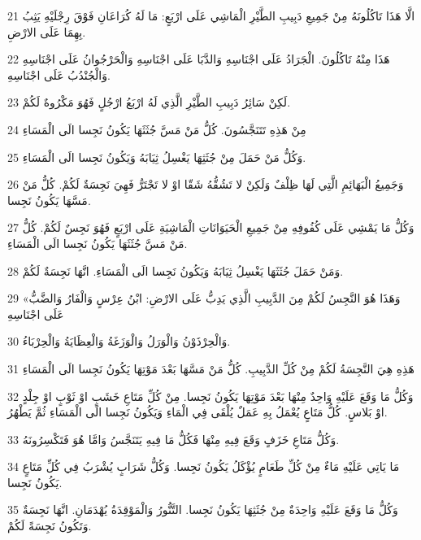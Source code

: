 \par 21 الَّا هَذَا تَاكُلُونَهُ مِنْ جَمِيعِ دَبِيبِ الطَّيْرِ الْمَاشِي عَلَى ارْبَعٍ: مَا لَهُ كُرَاعَانِ فَوْقَ رِجْلَيْهِ يَثِبُ بِهِمَا عَلَى الارْضِ.
\par 22 هَذَا مِنْهُ تَاكُلُونَ. الْجَرَادُ عَلَى اجْنَاسِهِ وَالدَّبَا عَلَى اجْنَاسِهِ وَالْحَرْجُوانُ عَلَى اجْنَاسِهِ وَالْجُنْدُبُ عَلَى اجْنَاسِهِ.
\par 23 لَكِنْ سَائِرُ دَبِيبِ الطَّيْرِ الَّذِي لَهُ ارْبَعُ ارْجُلٍ فَهُوَ مَكْرُوهٌ لَكُمْ.
\par 24 مِنْ هَذِهِ تَتَنَجَّسُونَ. كُلُّ مَنْ مَسَّ جُثَثَهَا يَكُونُ نَجِسا الَى الْمَسَاءِ
\par 25 وَكُلُّ مَنْ حَمَلَ مِنْ جُثَثِهَا يَغْسِلُ ثِيَابَهُ وَيَكُونُ نَجِسا الَى الْمَسَاءِ.
\par 26 وَجَمِيعُ الْبَهَائِمِ الَّتِي لَهَا ظِلْفٌ وَلَكِنْ لا تَشُقُّهُ شَقّا اوْ لا تَجْتَرُّ فَهِيَ نَجِسَةٌ لَكُمْ. كُلُّ مَنْ مَسَّهَا يَكُونُ نَجِسا.
\par 27 وَكُلُّ مَا يَمْشِي عَلَى كُفُوفِهِ مِنْ جَمِيعِ الْحَيَوَانَاتِ الْمَاشِيَةِ عَلَى ارْبَعٍ فَهُوَ نَجِسٌ لَكُمْ. كُلُّ مَنْ مَسَّ جُثَثَهَا يَكُونُ نَجِسا الَى الْمَسَاءِ.
\par 28 وَمَنْ حَمَلَ جُثَثَهَا يَغْسِلُ ثِيَابَهُ وَيَكُونُ نَجِسا الَى الْمَسَاءِ. انَّهَا نَجِسَةٌ لَكُمْ.
\par 29 «وَهَذَا هُوَ النَّجِسُ لَكُمْ مِنَ الدَّبِيبِ الَّذِي يَدِبُّ عَلَى الارْضِ: ابْنُ عِرْسٍ وَالْفَارُ وَالضَّبُّ عَلَى اجْنَاسِهِ
\par 30 وَالْحِرْذَوْنُ وَالْوَرَلُ وَالْوَزَغَةُ وَالْعِظَايَةُ وَالْحِرْبَاءُ.
\par 31 هَذِهِ هِيَ النَّجِسَةُ لَكُمْ مِنْ كُلِّ الدَّبِيبِ. كُلُّ مَنْ مَسَّهَا بَعْدَ مَوْتِهَا يَكُونُ نَجِسا الَى الْمَسَاءِ
\par 32 وَكُلُّ مَا وَقَعَ عَلَيْهِ وَاحِدٌ مِنْهَا بَعْدَ مَوْتِهَا يَكُونُ نَجِسا. مِنْ كُلِّ مَتَاعِ خَشَبٍ اوْ ثَوْبٍ اوْ جِلْدٍ اوْ بَلاسٍ. كُلُّ مَتَاعٍ يُعْمَلُ بِهِ عَمَلٌ يُلْقَى فِي الْمَاءِ وَيَكُونُ نَجِسا الَى الْمَسَاءِ ثُمَّ يَطْهُرُ.
\par 33 وَكُلُّ مَتَاعِ خَزَفٍ وَقَعَ فِيهِ مِنْهَا فَكُلُّ مَا فِيهِ يَتَنَجَّسُ وَامَّا هُوَ فَتَكْسِرُونَهُ.
\par 34 مَا يَاتِي عَلَيْهِ مَاءٌ مِنْ كُلِّ طَعَامٍ يُؤْكَلُ يَكُونُ نَجِسا. وَكُلُّ شَرَابٍ يُشْرَبُ فِي كُلِّ مَتَاعٍ يَكُونُ نَجِسا.
\par 35 وَكُلُّ مَا وَقَعَ عَلَيْهِ وَاحِدَةٌ مِنْ جُثَثِهَا يَكُونُ نَجِسا. التَّنُّورُ وَالْمَوْقِدَةُ يُهْدَمَانِ. انَّهَا نَجِسَةٌ وَتَكُونُ نَجِسَةً لَكُمْ.
